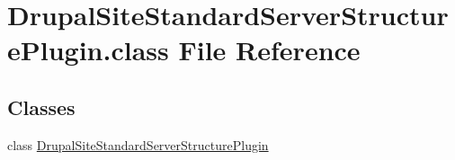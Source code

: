 \hypertarget{DrupalSiteStandardServerStructurePlugin_8class}{\section{Drupal\-Site\-Standard\-Server\-Structure\-Plugin.\-class File Reference}
\label{DrupalSiteStandardServerStructurePlugin_8class}
}
\subsection*{Classes}
\begin{DoxyCompactItemize}
\item 
class \hyperlink{classDrupalSiteStandardServerStructurePlugin}{Drupal\-Site\-Standard\-Server\-Structure\-Plugin}
\end{DoxyCompactItemize}
